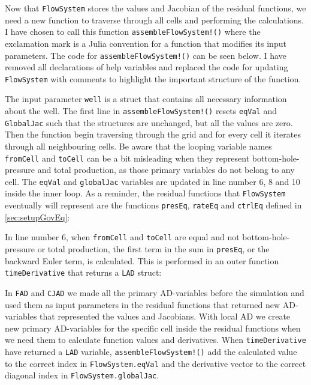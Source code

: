 Now that \texttt{FlowSystem} stores the  values and Jacobian of the residual functions, we need a new function to traverse through all cells and performing the calculations. I have chosen to call this function \texttt{assembleFlowSystem!()} where the exclamation mark is a Julia convention for a function that modifies its input parameters. The code for \texttt{assembleFlowSystem!()} can be seen below. I have removed all declarations of help variables and replaced the code for updating \texttt{FlowSystem} with comments to highlight the important structure of the function.
\lstset{numbers=left}

\lstset{numbers=none}
The input parameter \texttt{well} is a struct that contains all necessary information about the well. The first line in \texttt{assembleFlowSystem!()} resets \texttt{eqVal} and \texttt{GlobalJac} such that the structures are unchanged, but all the values are zero. Then the function begin traversing through the grid and for every cell it iterates through all neighbouring cells. Be aware that the looping variable names \texttt{fromCell} and \texttt{toCell} can be a bit misleading when they represent bottom-hole-pressure and total production, as those primary variables do not belong to any cell. The \texttt{eqVal} and \texttt{globalJac} variables are updated in line number 6, 8 and 10 inside the inner loop. As a reminder, the residual functions that \texttt{FlowSystem} eventually will represent are the functions \texttt{presEq}, \texttt{rateEq} and \texttt{ctrlEq} defined in \autoref{sec:setupGovEq}:


In line number 6, when \texttt{fromCell} and \texttt{toCell} are equal and not bottom-hole-pressure or total production, the first term in the sum in \texttt{presEq}, or the backward Euler term, is calculated. This is performed in an outer function \texttt{timeDerivative} that returns a \texttt{LAD} struct:

In \texttt{FAD} and \texttt{CJAD} we made all the primary AD-variables before the simulation and used them as input parameters in the residual functions that returned new AD-variables that represented the values and Jacobians. With local AD we create new primary AD-variables for the specific cell inside the residual functions when we need them to calculate function values and derivatives. When \texttt{timeDerivative} have returned a \texttt{LAD} variable, \texttt{assembleFlowSystem!()} add the calculated value to the correct index in \texttt{FlowSystem.eqVal} and the derivative vector to the correct diagonal index in \texttt{FlowSystem.globalJac}.

